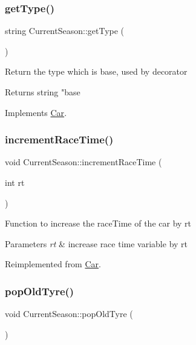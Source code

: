 \subsubsection{\texorpdfstring{get\+Type()}{getType()}}
{\footnotesize\ttfamily string Current\+Season\+::get\+Type (\begin{DoxyParamCaption}{ }\end{DoxyParamCaption})\hspace{0.3cm}{\ttfamily [virtual]}}

Return the type which is base, used by decorator \begin{DoxyReturn}{Returns}
string "base 
\end{DoxyReturn}


Implements \hyperlink{classCar_ae502eb1c04753317ebdb759497fd030c}{Car}.

\mbox{\label{classCurrentSeason_a58d31e4029253b1c244ee44f0052916f}} 
\subsubsection{\texorpdfstring{increment\+Race\+Time()}{incrementRaceTime()}}
{\footnotesize\ttfamily void Current\+Season\+::increment\+Race\+Time (\begin{DoxyParamCaption}\item[{int}]{rt }\end{DoxyParamCaption})\hspace{0.3cm}{\ttfamily [virtual]}}

Function to increase the race\+Time of the car by rt 
\begin{DoxyParams}{Parameters}
{\em rt} & increase race time variable by rt \\
\hline
\end{DoxyParams}


Reimplemented from \hyperlink{classCar_a3944276e317e680a756ac58e7bac6e6f}{Car}.

\mbox{\label{classCurrentSeason_a4d58f649f43cc8ea8c1e7e0745b7dc1f}} 
\subsubsection{\texorpdfstring{pop\+Old\+Tyre()}{popOldTyre()}}
{\footnotesize\ttfamily void Current\+Season\+::pop\+Old\+Tyre (\begin{DoxyParamCaption}{ }\end{DoxyParamCaption})\hspace{0.3cm}{\ttfamily [virtual]}}


